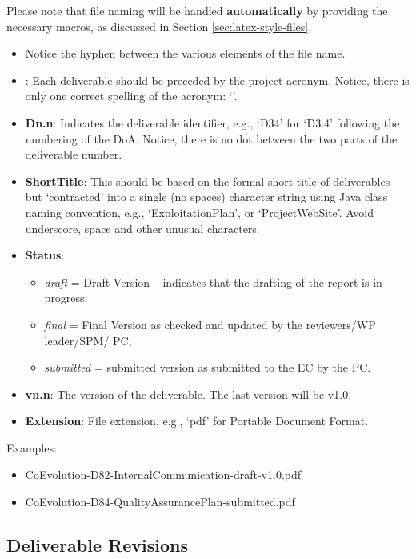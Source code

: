 Please note that file naming will be handled \textbf{automatically} by providing the necessary macros, as discussed in Section \ref{sec:latex-style-files}.

\begin{itemize}
	\item Notice the hyphen between the various elements of the file name.
    \item {\bf \hyperride{}}: Each \hyperride{} deliverable should be preceded by the project acronym. Notice, there is only one correct spelling of the acronym: ‘\hyperride{}’. 
    \item {\bf Dn.n}: Indicates the deliverable identifier, e.g., ‘D34’ for ‘D3.4’ following the numbering of the \ac{DoA}. Notice, there is no dot between the two parts of the deliverable number.
    \item {\bf ShortTitle}: This should be based on the formal short title of deliverables but ‘contracted’ into a single (no spaces) character string using Java class naming convention, e.g., ‘ExploitationPlan’,  or ‘ProjectWebSite’. Avoid underscore, space and other unusual characters.
	\item {\bf Status}: 
	\begin{itemize}
		\item \textit{draft} = Draft Version – indicates that the drafting of the report is in progress; 
		\item \textit{final} = Final Version as checked and updated by the reviewers/WP leader/SPM/ PC; 
		\item \textit{submitted} = submitted version as submitted to the EC by the PC.
	\end{itemize}
	\item {\bf vn.n}: The version of the deliverable. The last version will be v1.0.
    \item {\bf Extension}: File extension, e.g., ‘pdf’ for Portable Document Format. 
\end{itemize}

Examples:

\begin{itemize}
    \item CoEvolution-D82-InternalCommunication-draft-v1.0.pdf
    \item CoEvolution-D84-QualityAssurancePlan-submitted.pdf
\end{itemize}



\subsection{Deliverable Revisions}
\label{sec:change-log}

